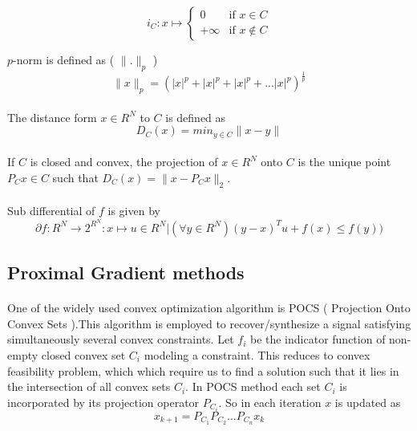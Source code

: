 \begin{equation}
i_C : x \mapsto \left\lbrace \begin{array}{ll}
0        &  \mbox{if } x \in C\\
+ \infty & \mbox{if } x \notin C 
\end{array} \right.
\label{3.2}
\end{equation}

$p$-norm is defined as ( $\parallel . \parallel_{p}$ )
\begin{equation}
\parallel x \parallel_p = ( |x|^p + |x|^p + |x|^p +... |x|^p )^{\frac{1}{p}}
\label{3.3}
\end{equation}

\paragraph{}The distance form $x \in R^N$ to $C$ is defined as 
\begin{equation}
 D_C(x) =  min_{y \in C} \parallel x - y \parallel
\label{3.4}
\end{equation}

\paragraph{}If $C$ is closed and convex, the projection of $x \in R^N$ onto $C$ is the unique point $P_Cx \in C$
such that $D_C(x) = \parallel x - P_Cx \parallel_2$.

\paragraph{}Sub differential of $f$ is given by
\begin{equation}
 \partial f : R^N \rightarrow 2^{R^N} : x \mapsto { u \in R^N | (\forall y \in R^N) (y-x)^Tu+f(x) \leq f(y))}
\label{3.5}
\end{equation}

\subsection{Proximal Gradient methods}
\label{s:algorithms_pgm}
\paragraph{}One of the widely used convex optimization algorithm is POCS
( Projection Onto Convex Sets ).This algorithm is employed to recover/synthesize a signal
satisfying simultaneously several convex constraints. Let $f_i$ be the indicator function of non-empty
closed convex set $C_i$ modeling a constraint. This reduces to convex feasibility problem, which 
which require us to find a solution such that it lies in the intersection of all convex sets $C_i$. In POCS 
method each set $C_i$ is incorporated by its projection operator $P_{C_i}$. So in each iteration 
$x$ is updated as
\begin{equation}
x_{k+1} = P_{C_1}  P_{C_2} ... P_{C_n}x_k
\label{3.6}
\end{equation}
